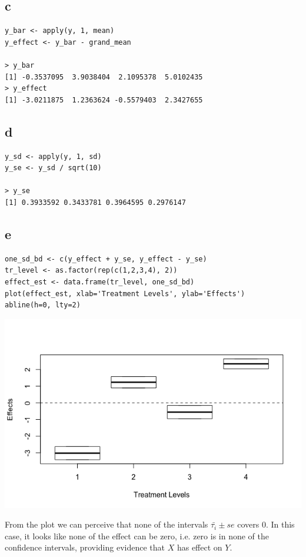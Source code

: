 \documentclass[11pt,letterpaper]{article}
\begin{document}
\subsection*{c}
\begin{verbatim}
y_bar <- apply(y, 1, mean)
y_effect <- y_bar - grand_mean

> y_bar
[1] -0.3537095  3.9038404  2.1095378  5.0102435
> y_effect
[1] -3.0211875  1.2363624 -0.5579403  2.3427655
\end{verbatim}

\subsection*{d}
\begin{verbatim}
y_sd <- apply(y, 1, sd)
y_se <- y_sd / sqrt(10)

> y_se
[1] 0.3933592 0.3433781 0.3964595 0.2976147
\end{verbatim}

\subsection*{e}
\begin{verbatim}
one_sd_bd <- c(y_effect + y_se, y_effect - y_se)
tr_level <- as.factor(rep(c(1,2,3,4), 2))
effect_est <- data.frame(tr_level, one_sd_bd)
plot(effect_est, xlab='Treatment Levels', ylab='Effects')
abline(h=0, lty=2)
\end{verbatim}
\includegraphics[scale=0.5]{lect-7-1-e.png}

\noindent From the plot we can perceive that none of the intervals $\bar{\tau_i} \pm se$ covers 0. In this case, it looks like none of the effect can be zero, i.e. zero is in none of the confidence intervals, providing evidence that $X$ has effect on $Y$.
\end{document}
